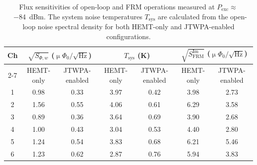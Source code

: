 \documentclass[10pt]{iopart}
\newcommand{\uPhirtHz}{$\upmu \Phi_0/\sqrt{\text{Hz}}$\xspace}
\begin{document}
\begin{table}[htb]
    \centering
    \begin{tabular}{c cc cc cc}
    \hline
    \multirow{2}{*}{Ch} & \multicolumn{2}{c}{$\sqrt{S_{\Phi,w}}$ (\uPhirtHz)} & \multicolumn{2}{c}{$T_{\text{sys}}$ (K)} & \multicolumn{2}{c}{$\sqrt{S^{\text{Im}}_{\text{FRM}}}$ (\uPhirtHz)} \\
    \cline{2-7}
    & HEMT-only & JTWPA-enabled & HEMT-only & JTWPA-enabled & HEMT-only & JTWPA-enabled \\
    \hline
    1 & 0.98 & 0.33 & 3.97 & 0.42 & 3.98 & 2.73 \\
    2 & 1.56 & 0.55 & 4.06 & 0.61 & 6.29 & 3.58 \\
    3 & 0.89 & 0.36 & 3.64 & 0.69 & 3.90 & 2.68 \\
    4 & 1.00 & 0.43 & 3.04 & 0.53 & 4.40 & 2.80 \\
    5 & 1.24 & 0.54 & 3.83 & 0.68 & 6.21 & 5.46 \\
    6 & 1.23 & 0.62 & 2.87 & 0.76 & 5.94 & 3.83 \\
    \hline
    \end{tabular}
    \caption{Flux sensitivities of open-loop and FRM operations measured at \mbox{$P_{\text{exc}}\approx$~\qty{-84}{dBm}}. The system noise temperatures $T_{\text{sys}}$ are calculated from the open-loop noise spectral density for both HEMT-only and JTWPA-enabled configurations.}
    \label{tab:TWPA_noise}
\end{table}
\end{document}
